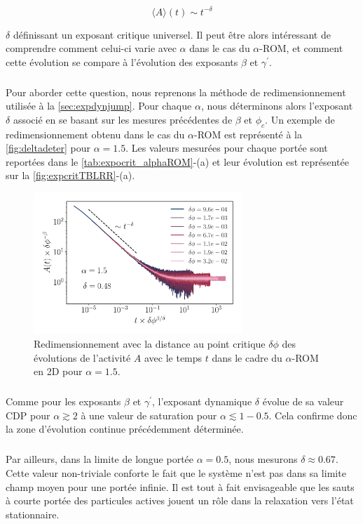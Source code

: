 \begin{equation}
	 \langle A \rangle (t) \sim t^{-\delta}
\end{equation}

\noindent $\delta$ définissant un exposant critique universel. Il peut être alors intéressant de comprendre comment celui-ci varie avec $\alpha$ dans le cas du $\alpha$-ROM, et comment cette évolution se compare à l'évolution des exposants $\beta$ et $\gamma^\prime$.

\subparagraph{}Pour aborder cette question, nous reprenons la méthode de redimensionnement utilisée à la \autoref{sec:expdynjump}. Pour chaque $\alpha$, nous déterminons alors l'exposant $\delta$ associé en se basant sur les mesures précédentes de $\beta$ et $\phi_c$. Un exemple de redimensionnement obtenu dans le cas du $\alpha$-ROM est représenté à la \autoref{fig:deltadeter} pour $\alpha = 1.5$. Les valeurs mesurées pour chaque portée sont reportées dans le \autoref{tab:expocrit_alphaROM}-(a) et leur évolution est représentée sur la \autoref{fig:expcritTBLRR}-(a).

\begin{figure}[h]
	\centering
	\includegraphics[width=0.7\textwidth]{Chapitre3/Figures/Delta/DeltaDetermination.pdf}
	\caption{Redimensionnement avec la distance au point critique $\delta\phi$ des évolutions de l'activité $A$ avec le temps $t$ dans le cadre du $\alpha$-ROM en 2D pour $\alpha = 1.5$.}
	\label{fig:deltadeter}
\end{figure}

\subparagraph{}Comme pour les exposants $\beta$ et $\gamma^\prime$, l'exposant dynamique $\delta$ évolue de sa valeur CDP pour $\alpha\gtrsim 2$ à une valeur de saturation pour $\alpha \lesssim 1-0.5$. Cela confirme donc la zone d'évolution continue précédemment déterminée.

\subparagraph{}Par ailleurs, dans la limite de longue portée $\alpha=0.5$, nous mesurons $\delta\approx0.67$. Cette valeur non-triviale conforte le fait que le système n'est pas dans sa limite champ moyen pour une portée infinie. Il est tout à fait envisageable que les sauts à courte portée des particules actives jouent un rôle dans la relaxation vers l'état stationnaire.

